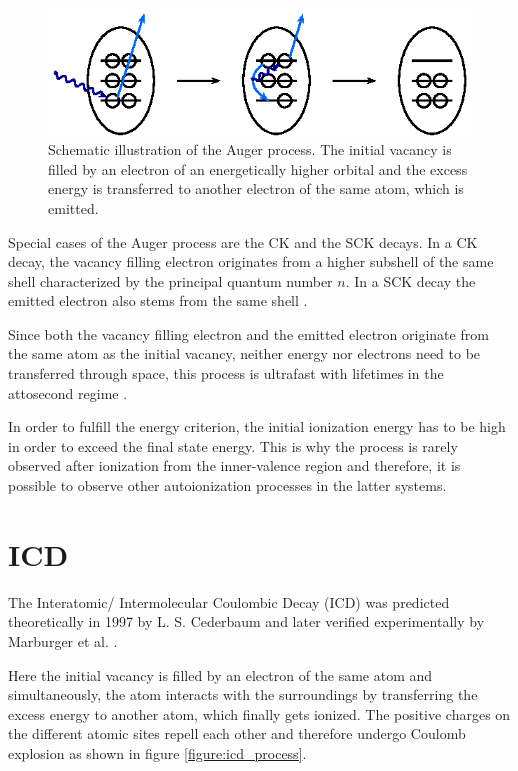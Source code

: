 \begin{figure}[h]
 \centering
 \includegraphics{pics/auger-pspic.eps}
 \caption{Schematic illustration of the Auger process. The initial vacancy is
          filled by an electron of an energetically higher orbital and the
          excess energy is transferred to another electron of the same atom,
          which is emitted.}
 \label{figure:auger_process}
\end{figure}

Special cases of the Auger process are the \ac{CK} and the \ac{SCK} decays.
In a \ac{CK} decay, the vacancy filling electron originates from a higher subshell
of the same shell characterized by the principal quantum number $n$. In a \ac{SCK}
decay the emitted electron also stems from the same shell \cite{Coster35}.

Since both the vacancy filling electron and the emitted electron originate
from the same atom as the initial vacancy, neither energy nor electrons need
to be transferred through space, this process is ultrafast with lifetimes
in the attosecond regime \cite{Ohno03}.

In order to fulfill the energy criterion, the initial ionization energy has to
be high in order to exceed the final state energy. This is why
the process is rarely observed after
ionization from the inner-valence region and therefore, it is possible to
observe other autoionization processes in the latter systems.

\section{\acl{ICD}}
The Interatomic/ Intermolecular Coulombic Decay (ICD) was predicted
theoretically in 1997 by L. S. Cederbaum \cite{Cederbaum97}
and later verified experimentally by Marburger et al. \cite{Marburger03}.

Here the initial vacancy is filled by an electron of the same atom and simultaneously,
the atom interacts with the surroundings by
transferring the excess energy to another atom, which finally gets ionized. The
positive charges on the different atomic sites repell each other and therefore undergo
Coulomb explosion as shown in figure \ref{figure:icd_process}.


